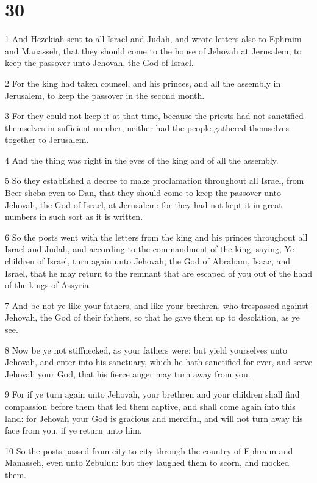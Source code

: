 \chapter{30}

\par 1 And Hezekiah sent to all Israel and Judah, and wrote letters also to Ephraim and Manasseh, that they should come to the house of Jehovah at Jerusalem, to keep the passover unto Jehovah, the God of Israel.
\par 2 For the king had taken counsel, and his princes, and all the assembly in Jerusalem, to keep the passover in the second month.
\par 3 For they could not keep it at that time, because the priests had not sanctified themselves in sufficient number, neither had the people gathered themselves together to Jerusalem.
\par 4 And the thing was right in the eyes of the king and of all the assembly.
\par 5 So they established a decree to make proclamation throughout all Israel, from Beer-sheba even to Dan, that they should come to keep the passover unto Jehovah, the God of Israel, at Jerusalem: for they had not kept it in great numbers in such sort as it is written.
\par 6 So the posts went with the letters from the king and his princes throughout all Israel and Judah, and according to the commandment of the king, saying, Ye children of Israel, turn again unto Jehovah, the God of Abraham, Isaac, and Israel, that he may return to the remnant that are escaped of you out of the hand of the kings of Assyria.
\par 7 And be not ye like your fathers, and like your brethren, who trespassed against Jehovah, the God of their fathers, so that he gave them up to desolation, as ye see.
\par 8 Now be ye not stiffnecked, as your fathers were; but yield yourselves unto Jehovah, and enter into his sanctuary, which he hath sanctified for ever, and serve Jehovah your God, that his fierce anger may turn away from you.
\par 9 For if ye turn again unto Jehovah, your brethren and your children shall find compassion before them that led them captive, and shall come again into this land: for Jehovah your God is gracious and merciful, and will not turn away his face from you, if ye return unto him.
\par 10 So the posts passed from city to city through the country of Ephraim and Manasseh, even unto Zebulun: but they laughed them to scorn, and mocked them.
